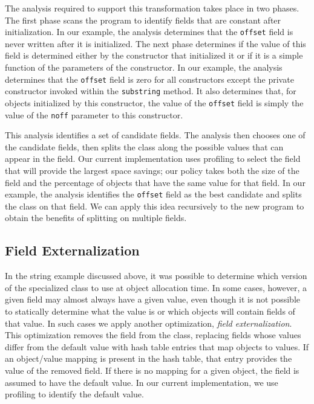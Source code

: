 \documentclass{acmconf}
\begin{document}
The analysis required to support this transformation takes place
in two phases. The first phase scans the program
to identify fields that
are constant after initialization. In our example, the analysis
determines that the {\tt offset} field is never written after
it is initialized. The next phase determines if the value
of this field is determined either by the constructor that
initialized it or if it is a simple function of the parameters
of the constructor. In our example, the analysis determines
that the {\tt offset} field is zero for all constructors
except the private constructor invoked within the {\tt substring}
method. It also determines that, for objects initialized by 
this constructor, the value of the {\tt offset} field is simply
the value of the {\tt noff} parameter to this constructor. 

This analysis identifies a set of candidate fields. 
The analysis then chooses one of the candidate fields, then 
splits the class along the possible values
that can appear in the field. Our current implementation uses
profiling to select the field that will provide the largest
space savings; our policy takes both the size of the field
and the percentage of objects that have the same value for 
that field. In our example, the analysis identifies the 
{\tt offset} field as the best candidate and splits the class
on that field. We can apply this idea recursively to the 
new program to obtain the benefits of splitting on multiple
fields. 

\subsection{Field Externalization}

In the string example discussed above, it was possible to determine
which version of the specialized class to use at object allocation
time. In some cases, however, a given field may almost always have
a given value, even though it is not possible to statically determine
what the value is or which objects will contain fields of that 
value. In such cases we apply another optimization, 
{\em field externalization}. This optimization removes the field
from the class, replacing fields whose values differ from the default 
value with hash table entries that map objects to values. If an object/value
mapping is present in the hash table, that entry provides the 
value of the removed field. If there is no mapping for a given object,
the field is assumed to have the default value. 
In our current implementation, we use profiling 
to identify the default value. 
\end{document}
